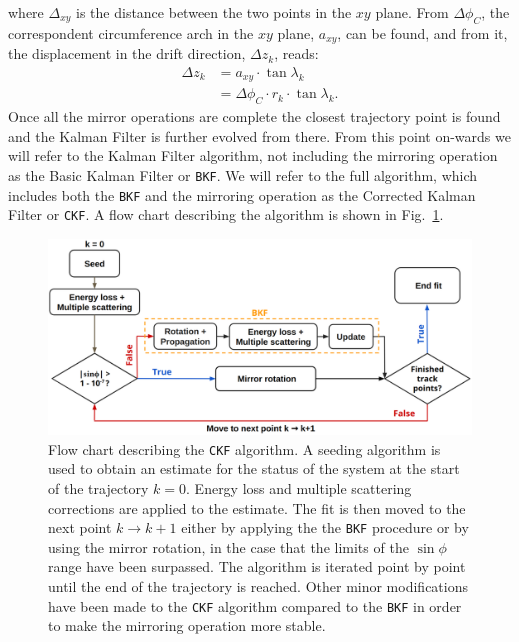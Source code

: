 where $\Delta_{xy}$ is the distance between the two points in the $xy$ plane. From $\Delta \phi_C$, the correspondent circumference arch in the $xy$ plane, $a_{xy}$, can be found, and from it, the displacement in the drift direction, $\Delta z_k$, reads:
\begin{equation}
    \begin{aligned}
        \Delta z_k &= a_{xy} \cdot \tan{\lambda_k} \\
             &= \Delta \phi_C \cdot r_k \cdot \tan{\lambda_k} .
    \end{aligned}  
\end{equation}
Once all the mirror operations are complete the closest trajectory point is found and the Kalman Filter is further evolved from there. From this point on-wards we will refer to the Kalman Filter algorithm, not including the mirroring operation as the Basic Kalman Filter or \texttt{BKF}. We will refer to the full algorithm, which includes both the \texttt{BKF} and the mirroring operation as the Corrected Kalman Filter or \texttt{CKF}. A flow chart describing the algorithm is shown in Fig.~\ref{fig:Logic}.
\begin{figure}[t]
     \centering
     \includegraphics[width=\textwidth]{figures/ch5-KF_NDGAr/KFFlowChart_new.eps}
     \caption{Flow chart describing the \texttt{CKF} algorithm. A seeding algorithm is used to obtain an estimate for the status of the system at the start of the trajectory $k=0$. Energy loss and multiple scattering corrections are applied to the estimate. The fit is then moved to the next point $k\rightarrow k+1$ either by applying the the \texttt{BKF} procedure or by using the mirror rotation, in the case that the limits of the $\sin\phi$ range have been surpassed. The algorithm is iterated point by point until the end of the trajectory is reached. Other minor modifications have been made to the \texttt{CKF} algorithm compared to the \texttt{BKF} in order to make the mirroring operation more stable. }
        \label{fig:Logic}
\end{figure}


